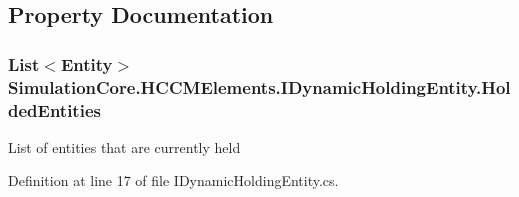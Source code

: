 \subsection{Property Documentation}
\subsubsection[{\texorpdfstring{Holded\+Entities}{HoldedEntities}}]{\setlength{\rightskip}{0pt plus 5cm}List$<${\bf Entity}$>$ Simulation\+Core.\+H\+C\+C\+M\+Elements.\+I\+Dynamic\+Holding\+Entity.\+Holded\+Entities\hspace{0.3cm}{\ttfamily [get]}}\hypertarget{interface_simulation_core_1_1_h_c_c_m_elements_1_1_i_dynamic_holding_entity_a896bbc03165a90d8c4a9470c4ebe3d87}{}\label{interface_simulation_core_1_1_h_c_c_m_elements_1_1_i_dynamic_holding_entity_a896bbc03165a90d8c4a9470c4ebe3d87}


List of entities that are currently held 



Definition at line 17 of file I\+Dynamic\+Holding\+Entity.\+cs.

